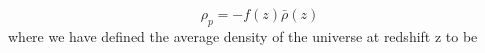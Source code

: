 \begin{equation}
\rho_p = -f(z) \bar{\rho}(z) 
\end{equation}
where we have defined the average density of the universe at redshift z to be
